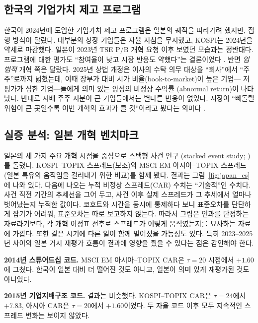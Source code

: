 \documentclass[12pt]{article}
\begin{document}
\subsection{한국의 기업가치 제고 프로그램}

한국이 2024년에 도입한 기업가치 제고 프로그램은 일본의 궤적을 따라가려 했지만, 집행 방식이 달랐다. 대부분의 상장 기업들은 자율 지침을 무시했고, KOSPI는 2024년을 약세로 마감했다. 일본이 2023년 TSE P/B 개혁 요청 이후 보였던 모습과는 정반대다. 프로그램에 대한 평가도 ``참여율이 낮고 시장 반응도 약했다''는 결론이었다 \citep{lee2025valueup}. 반면 \emph{입법적} 개혁 쪽은 달랐다. 2025년 상법 개정은 이사의 수탁 의무 대상을 ``회사''에서 ``주주''로까지 넓혔는데, 이때 장부가 대비 시가 비율(book-to-market)이 높은 기업--- 저평가가 심한 기업---들에게 의미 있는 양성의 비정상 수익률 (abnormal return)이 나타났다. 반대로 지배 주주 지분이 큰 기업들에서는 별다른 반응이 없었다. 시장이 ``빼돌릴 위험이 큰 곳일수록 이번 개혁의 효과가 클 것''이라고 봤다는 의미다 \citep{kang2026commercial}.

\subsection{실증 분석: 일본 개혁 벤치마크}
\label{sec:empirical_japan}

일본의 세 가지 주요 개혁 시점을 중심으로 스택형 사건 연구 (stacked event study; \citealt{cengiz2019})를 돌렸다. KOSPI--TOPIX 스프레드(보조)와 MSCI EM 아시아--TOPIX 스프레드(일본 특유의 움직임을 걸러내기 위한 비교)를 함께 봤다. 결과는 그림~\ref{fig:japan_es}에 나와 있다. 다음에 나오는 누적 비정상 스프레드(CAR) 수치는 ``기술적''인 수치다. 사건 직전 기간의 추세선을 그어 두고, 사건 이후 실제 스프레드가 그 추세에서 얼마나 벗어났는지 누적한 값이다. 코호트와 시간을 동시에 통제하다 보니 표준오차를 단단하게 잡기가 어려워, 표준오차는 따로 보고하지 않는다. 따라서 그림은 인과를 단정하는 자료라기보다, 각 개혁 이정표 전후로 스프레드가 어떻게 움직였는지를 묘사하는 자료에 가깝다. 또한 같은 시기에 다른 일이 함께 벌어졌을 가능성도 있다. 특히 2023--2025년 사이의 일본 거시 재평가 흐름이 결과에 영향을 줬을 수 있다는 점은 감안해야 한다.

\textbf{2014년 스튜어드십 코드.} MSCI EM 아시아--TOPIX CAR은 $\tau=20$ 시점에서 $+1.60$에 그쳤다. 한국이 일본 대비 더 떨어진 것도 아니고, 일본이 의미 있게 재평가된 것도 아니었다.

\textbf{2015년 기업지배구조 코드.} 결과는 비슷했다. KOSPI--TOPIX CAR은 $\tau=24$에서 $+7.83$, 아시아 CAR은 $\tau=20$에서 $+1.60$이었다. 두 자율 코드 이후 모두 지속적인 스프레드 변화는 보이지 않았다.
\end{document}
